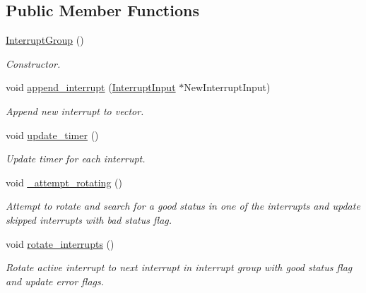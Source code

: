 \subsection*{Public Member Functions}
\begin{DoxyCompactItemize}
\item 
\hyperlink{classSPMB_1_1InterruptGroup_ae9b011533b9da5bf30a761a9807a81fd}{Interrupt\+Group} ()\hypertarget{classSPMB_1_1InterruptGroup_ae9b011533b9da5bf30a761a9807a81fd}{}\label{classSPMB_1_1InterruptGroup_ae9b011533b9da5bf30a761a9807a81fd}

\begin{DoxyCompactList}\small\item\em Constructor. \end{DoxyCompactList}\item 
void \hyperlink{classSPMB_1_1InterruptGroup_af657eec701e542ca195e2ac8fe817527}{append\+\_\+interrupt} (\hyperlink{classSPMB_1_1InterruptInput}{Interrupt\+Input} $\ast$New\+Interrupt\+Input)\hypertarget{classSPMB_1_1InterruptGroup_af657eec701e542ca195e2ac8fe817527}{}\label{classSPMB_1_1InterruptGroup_af657eec701e542ca195e2ac8fe817527}

\begin{DoxyCompactList}\small\item\em Append new interrupt to vector. \end{DoxyCompactList}\item 
void \hyperlink{classSPMB_1_1InterruptGroup_a40e413db26817d4381295fbe0cc41f85}{update\+\_\+timer} ()\hypertarget{classSPMB_1_1InterruptGroup_a40e413db26817d4381295fbe0cc41f85}{}\label{classSPMB_1_1InterruptGroup_a40e413db26817d4381295fbe0cc41f85}

\begin{DoxyCompactList}\small\item\em Update timer for each interrupt. \end{DoxyCompactList}\item 
void \hyperlink{classSPMB_1_1InterruptGroup_acb1097331ab9adc74cfc49405d313e94}{\+\_\+attempt\+\_\+rotating} ()\hypertarget{classSPMB_1_1InterruptGroup_acb1097331ab9adc74cfc49405d313e94}{}\label{classSPMB_1_1InterruptGroup_acb1097331ab9adc74cfc49405d313e94}

\begin{DoxyCompactList}\small\item\em Attempt to rotate and search for a good status in one of the interrupts and update skipped interrupts with bad status flag. \end{DoxyCompactList}\item 
void \hyperlink{classSPMB_1_1InterruptGroup_a0636f92ce6b96c7e3c2c93dd8b8352f9}{rotate\+\_\+interrupts} ()\hypertarget{classSPMB_1_1InterruptGroup_a0636f92ce6b96c7e3c2c93dd8b8352f9}{}\label{classSPMB_1_1InterruptGroup_a0636f92ce6b96c7e3c2c93dd8b8352f9}

\begin{DoxyCompactList}\small\item\em Rotate active interrupt to next interrupt in interrupt group with good status flag and update error flags. \end{DoxyCompactList}\end{DoxyCompactItemize}
